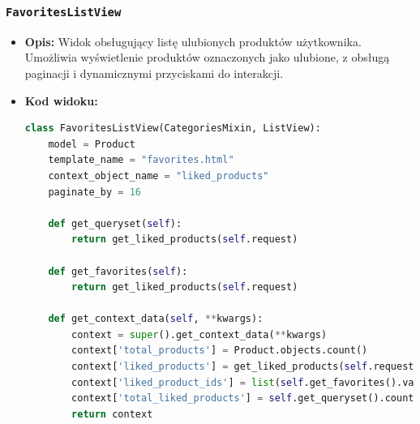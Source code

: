 \documentclass[12pt,a4paper,oneside]{article}
\theoremstyle{definition}
\numberwithin{equation}{section}
\begin{document}
\subsubsection*{\texttt{FavoritesListView}}
\begin{itemize}
    \item \textbf{Opis:} Widok obsługujący listę ulubionych produktów użytkownika. Umożliwia wyświetlenie produktów oznaczonych jako ulubione,
    z obsługą paginacji i dynamicznymi przyciskami do interakcji.
    \item \textbf{Kod widoku:}
    \begin{lstlisting}[language=Python, caption=FavoritesListView]
class FavoritesListView(CategoriesMixin, ListView):
    model = Product
    template_name = "favorites.html"
    context_object_name = "liked_products"
    paginate_by = 16

    def get_queryset(self):
        return get_liked_products(self.request)

    def get_favorites(self):
        return get_liked_products(self.request)

    def get_context_data(self, **kwargs):
        context = super().get_context_data(**kwargs)
        context['total_products'] = Product.objects.count()
        context['liked_products'] = get_liked_products(self.request)
        context['liked_product_ids'] = list(self.get_favorites().values_list('id', flat=True))
        context['total_liked_products'] = self.get_queryset().count()
        return context
    \end{lstlisting}


\end{itemize}
\end{document}
